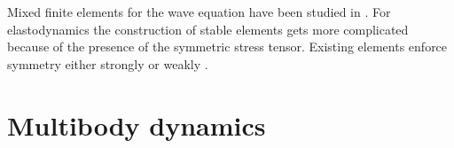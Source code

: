 Mixed finite elements for the wave equation have been studied in \cite{geveci1988,becache2000wave}. For elastodynamics the construction of stable elements gets more complicated because of the presence of the symmetric stress tensor. Existing elements enforce symmetry either strongly \cite{becache2001elas} or weakly \cite{arnold2014elastodynamics}.

\section{Multibody dynamics}